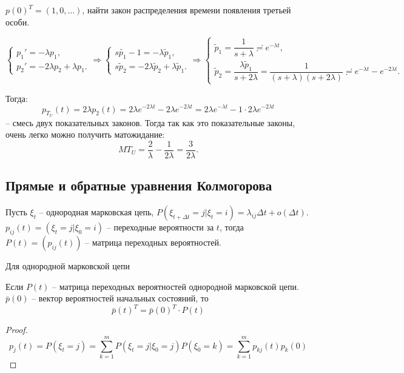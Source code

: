 \begin{ex}

  $p(0)^T = (1, 0, \dots)$, найти закон распределения времени появления третьей
  особи.

  \[
    \begin{cases}
      p_1' = - \lambda p_1, \\
      p_2' = -2 \lambda p_2 + \lambda p_1.
    \end{cases}
    \Rightarrow
    \begin{cases}
      s \tilde{p_1} - 1 = - \lambda \tilde p_1, \\
      s \tilde p_2 = - 2 \lambda \tilde p_2 + \lambda \tilde p_1.
    \end{cases}
    \Rightarrow
    \begin{cases}
      \tilde p_1 = \dfrac{1}{s+\lambda} \risingdotseq e^{-\lambda t}, \\
      \tilde p_2 = \dfrac{\lambda \tilde p_1}{s+2\lambda} 
      = \dfrac{1}{(s+\lambda)(s+2\lambda)} \risingdotseq e^{-\lambda t} - e^{-2\lambda t}.
    \end{cases}
  \]

  Тогда:
  \[
    p_{T_U} (t) = 2\lambda p_2(t) = 2\lambda e^{-2\lambda t} - 2\lambda e^{-2\lambda t}
    = 2 \lambda e^{-\lambda t} - 1 \cdot 2\lambda e^{-2\lambda t}
  \]
  -- смесь двух показательных законов.
  Тогда так как это показательные законы, очень легко можно получить матожидание:
  \[
    MT_U = \dfrac{2}{\lambda} - \dfrac{1}{2\lambda} = \dfrac{3}{2\lambda}.
  \]
\end{ex}



\subsection{Прямые и обратные уравнения Колмогорова}

\begin{definition}
  Пусть $\xi_t$ -- однородная марковская цепь,
  $P(\xi_{t+\Delta t} = j | \xi_t = i) = \lambda_{ij} \Delta t + o(\Delta t)$.
  $p_{ij}(t) = (\xi_t = j | \xi_0 = i)$ -- переходные вероятности за $t$,
  тогда $P(t) = (p_{ij}(t))$ -- матрица переходных вероятностей.
\end{definition}

\begin{theorem}
  Для однородной марковской цепи

  Если $P(t)$ -- матрица переходных вероятностей однородной марковской цепи.
  $\bar{p}(0)$ -- вектор вероятностей начальных состояний, то
  \[
    \bar{p}(t)^T = \bar{p}(0)^T \cdot P(t)
  \]
\end{theorem}
\begin{proof}
  \[
    p_j(t) = P(\xi_t = j) = \sum_{k=1}^m P(\xi_t = j | \xi_0=j) P(\xi_0=k)
    = \sum_{k=1}^m p_{kj}(t) p_k(0)
  \]
\end{proof}

